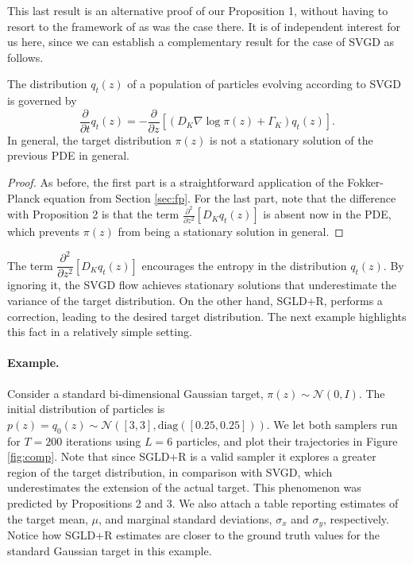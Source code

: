 This last result is an alternative proof of our Proposition 1, without having to resort to the framework of \cite{ma2015complete} as was the case there. It is of independent interest for us here, since we can establish a complementary result for the case of SVGD as follows.
\begin{proposition}
The distribution $q_t({z})$ of a population of particles evolving according to SVGD is governed by
$$
\frac{\partial}{\partial t} q_t({z}) = -\frac{\partial}{\partial {z}} \left[ (D_K \nabla \log \pi({z}) + \Gamma_K) q_t({z})\right] .
$$
In general, the target distribution $\pi({z})$ is not a stationary solution of the previous PDE in general.
\end{proposition}
\begin{proof}
As before, the first part is a straightforward application of the Fokker-Planck equation from Section \ref{sec:fp}. For the last part, note that the difference with Proposition 2 is that the term $\frac{\partial^2}{\partial {z}^2} \left[ D_K q_t({z})  \right]$ is absent now in the PDE, which prevents $\pi({z})$ from being a stationary solution in general.
\end{proof}
\noindent The term $\dfrac{\partial^2}{\partial {z}^2} \left[ D_K q_t({z})  \right]$ encourages the entropy in the distribution $q_t({z})$. By ignoring it, the SVGD flow achieves stationary solutions that underestimate the variance of the target distribution. On the other hand, SGLD+R, performs a correction, leading to the desired target distribution. The next example highlights this fact in a relatively simple setting.

\paragraph{Example.} Consider a standard bi-dimensional Gaussian target, $\pi({z}) \sim \mathcal{N}(0, I)$. The initial distribution of particles is $p({z}) = q_0({z}) \sim \mathcal{N}([3,3], \mbox{diag}([0.25, 0.25]))$. We let both samplers run for $T = 200$ iterations using $L = 6$ particles, and plot their trajectories in Figure \ref{fig:comp}. Note that since SGLD+R is a valid sampler it explores a greater region of the target distribution, in comparison with SVGD, which underestimates the extension of the actual target. This phenomenon was predicted by Propositions 2 and 3. We also attach a table reporting estimates of the target mean, $\mu$, and marginal standard deviations, $\sigma_x$ and $\sigma_y$, respectively. Notice how SGLD+R estimates are closer to the ground truth values for the standard Gaussian target in this example.

